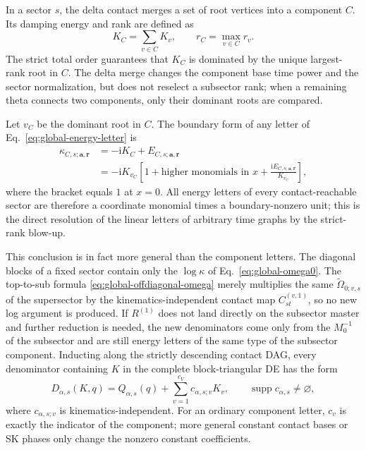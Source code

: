 \documentclass[11pt,a4paper]{article}
\newcommand{\ii}{\mathrm i}
\begin{document}
In a sector $s$, the delta contact merges a set of root vertices into a component $C$. Its damping energy and rank are defined as
\begin{equation}
 K_C=\sum_{v\in C}K_v,
 \qquad
 r_C=\max_{v\in C}r_v.
 \label{eq:component-energy-rank}
\end{equation}
The strict total order guarantees that $K_C$ is dominated by the unique largest-rank root in $C$. The delta merge changes the component base time power and the sector normalization, but does not reselect a subsector rank; when a remaining theta connects two components, only their dominant roots are compared.

Let $v_C$ be the dominant root in $C$. The boundary form of any letter of Eq.~\eqref{eq:global-energy-letter} is
\begin{equation}
 \begin{split}
 \kappa_{C,s;\bm a,\bm r}
 &=-\ii K_C+E_{C,s;\bm a,\bm r}\\
 &=-\ii K_{v_C}
 \left[1+\text{higher monomials in }x
 +\frac{\ii E_{C,s;\bm a,\bm r}}{K_{v_C}}\right],
 \end{split}
 \label{eq:boundary-letter-unit}
\end{equation}
where the bracket equals $1$ at $x=0$. All energy letters of every contact-reachable sector are therefore a coordinate monomial times a boundary-nonzero unit; this is the direct resolution of the linear letters of arbitrary time graphs by the strict-rank blow-up.

This conclusion is in fact more general than the component letters. The diagonal blocks of a fixed sector contain only the $\log\kappa$ of Eq.~\eqref{eq:global-omega0}. The top-to-sub formula \eqref{eq:global-offdiagonal-omega} merely multiplies the same $\widetilde\Omega_{0;v,s}$ of the supersector by the kinematics-independent contact map $C_{st}^{(v,1)}$, so no new log argument is produced. If $R^{(1)}$ does not land directly on the subsector master and further reduction is needed, the new denominators come only from the $M_0^{-1}$ of the subsector and are still energy letters of the same type of the subsector component. Inducting along the strictly descending contact DAG, every denominator containing $K$ in the complete block-triangular DE has the form
\begin{equation}
 D_{\alpha,s}(K,q)
 =Q_{\alpha,s}(q)
 +\sum_{v=1}^{c_V}c_{\alpha,s;v}K_v,
 \qquad
 \operatorname{supp}c_{\alpha,s}\neq\varnothing,
 \label{eq:general-affine-K-divisor}
\end{equation}
where $c_{\alpha,s;v}$ is kinematics-independent. For an ordinary component letter, $c_v$ is exactly the indicator of the component; more general constant contact bases or SK phases only change the nonzero constant coefficients.
\end{document}
